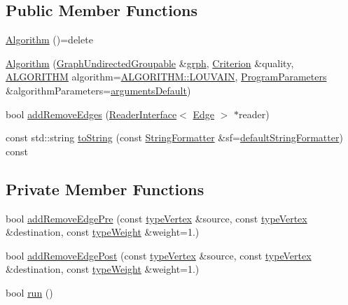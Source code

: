\subsection*{Public Member Functions}
\begin{DoxyCompactItemize}
\item 
\hyperlink{classAlgorithm_adb63a5f03ed70abb7e355631799c1ad0}{Algorithm} ()=delete
\item 
\hyperlink{classAlgorithm_a1a77fee87ecd410f2fae6db4c246c3ab}{Algorithm} (\hyperlink{classGraphUndirectedGroupable}{Graph\+Undirected\+Groupable} \&\hyperlink{classAlgorithmBase_a54b71b720b025291d9802e20874c860d}{grph}, \hyperlink{classCriterion}{Criterion} \&quality, \hyperlink{classAlgorithm_a38e19a8c3dc51b97563a34d9e59a748d}{A\+L\+G\+O\+R\+I\+T\+HM} algorithm=\hyperlink{classAlgorithm_a38e19a8c3dc51b97563a34d9e59a748dab77e66715d6be972cdbf6cc4d990e732}{A\+L\+G\+O\+R\+I\+T\+H\+M\+::\+L\+O\+U\+V\+A\+IN}, \hyperlink{structProgramParameters}{Program\+Parameters} \&algorithm\+Parameters=\hyperlink{program_8h_ae2d819404495f80f31db7676c1329d19}{arguments\+Default})
\item 
bool \hyperlink{classAlgorithm_a8ec65e07ed59a0f8b8491683b95626d2}{add\+Remove\+Edges} (\hyperlink{classReaderInterface}{Reader\+Interface}$<$ \hyperlink{classEdge}{Edge} $>$ $\ast$reader)
\item 
const std\+::string \hyperlink{classAlgorithm_a3b3172af613b02bfb1dc2502553d91c0}{to\+String} (const \hyperlink{classStringFormatter}{String\+Formatter} \&sf=\hyperlink{stringFormatter_8h_abf1349c8e24162d0134072aff288f2a2}{default\+String\+Formatter}) const
\end{DoxyCompactItemize}
\subsection*{Private Member Functions}
\begin{DoxyCompactItemize}
\item 
bool \hyperlink{classAlgorithm_a5835b23797b9d00f4090b996660af5d4}{add\+Remove\+Edge\+Pre} (const \hyperlink{edge_8h_a5fbd20c46956d479cb10afc9855223f6}{type\+Vertex} \&source, const \hyperlink{edge_8h_a5fbd20c46956d479cb10afc9855223f6}{type\+Vertex} \&destination, const \hyperlink{edge_8h_a2e7ea3be891ac8b52f749ec73fee6dd2}{type\+Weight} \&weight=1.)
\item 
bool \hyperlink{classAlgorithm_ad78e2c5819da723c373ce6d4a28ac36d}{add\+Remove\+Edge\+Post} (const \hyperlink{edge_8h_a5fbd20c46956d479cb10afc9855223f6}{type\+Vertex} \&source, const \hyperlink{edge_8h_a5fbd20c46956d479cb10afc9855223f6}{type\+Vertex} \&destination, const \hyperlink{edge_8h_a2e7ea3be891ac8b52f749ec73fee6dd2}{type\+Weight} \&weight=1.)
\item 
bool \hyperlink{classAlgorithm_a10dcb6b63ba40fad0bf11a0fef7b40f5}{run} ()
\end{DoxyCompactItemize}
